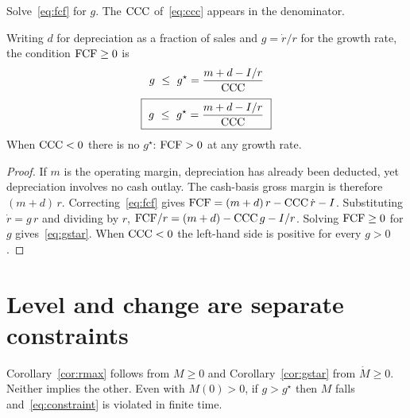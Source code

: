 Solve~\eqref{eq:fcf} for $g$. The $\mathrm{CCC}$ of~\eqref{eq:ccc} appears in the denominator.

\begin{corollary}
\label{cor:gstar}
Writing $d$ for depreciation as a fraction of sales and $g=\dot r/r$ for the growth rate,
the condition $\mathrm{FCF}\geq 0$ is
\ifdefined\HCode
{}%
\begin{equation}
g \ \leq\ g^{\star} = \frac{m + d - I/r}{\mathrm{CCC}}
\label{eq:gstar}
\end{equation}
\else
\begin{equation}
\boxed{\ g \ \leq\ g^{\star} = \frac{m + d - I/r}{\CCC}\ }
\label{eq:gstar}
\end{equation}
\fi
When $\mathrm{CCC}<0$ there is no $g^\star$: $\mathrm{FCF}>0$ at any growth rate.
\end{corollary}

\begin{proof}
If $m$ is the operating margin, depreciation has already been deducted, yet depreciation
involves no cash outlay. The cash-basis gross margin is therefore $(m+d)\,r$.
Correcting~\eqref{eq:fcf} gives $\FCF = (m+d)\,r - \CCC\,\dot r - I$.
Substituting $\dot r = g\,r$ and dividing by $r$,
$\mathrm{FCF}/r = (m+d) - \mathrm{CCC}\,g - I/r$.
Solving $\mathrm{FCF}\geq 0$ for $g$ gives~\eqref{eq:gstar}.
When $\mathrm{CCC}<0$ the left-hand side is positive for every $g>0$.
\end{proof}

\section{Level and change are separate constraints}
\label{sec:level-and-change}

\begin{remark}
\label{rem:level-and-change}
Corollary~\ref{cor:rmax} follows from $M\geq 0$ and Corollary~\ref{cor:gstar} from
$\dot M\geq 0$. Neither implies the other. Even with $M(0)>0$, if $g>g^\star$ then $M$
falls and~\eqref{eq:constraint} is violated in finite time.
\end{remark}

